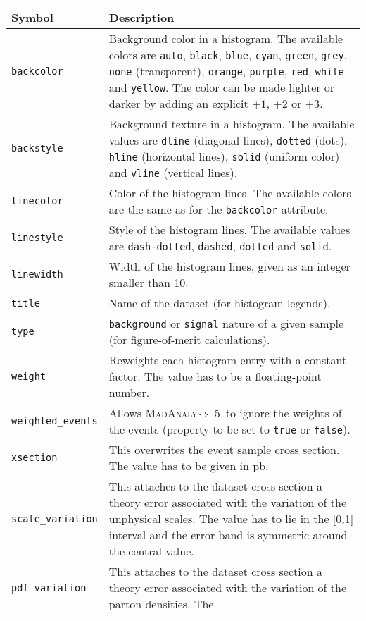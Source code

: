 \documentclass[a4paper]{article}
\newcommand{\MA}{\textsc{MadAnalysis}~5}
\begin{document}
\begin{center}\begin{tabular}{l p{9.1cm}}
\hline
Symbol& Description\\
\hline
\color{ao} \verb?backcolor? & Background color in a histogram. The available colors are
   \verb?auto?, \verb?black?, \verb?blue?, \verb?cyan?, \verb?green?,
   \verb?grey?, \verb?none? (transparent), \verb?orange?, \verb?purple?,
   \verb?red?, \verb?white? and \verb?yellow?. The color can be made lighter or
    darker by adding an explicit $\pm 1$, $\pm 2$ or $\pm 3$.\\
\color{ao} \verb?backstyle? & Background texture in a histogram. The available values are
   \verb?dline? (diagonal-lines), \verb?dotted? (dots), \verb?hline? (horizontal
   lines), \verb?solid? (uniform color) and \verb?vline? (vertical lines).\\
\color{ao} \verb?linecolor? & Color of the histogram lines. The available colors are the
   same as for the \verb?backcolor? attribute.\\
\color{ao} \verb?linestyle? & Style of the histogram lines. The available values are
   \verb?dash-dotted?, \verb?dashed?, \verb?dotted? and \verb?solid?.\\
\color{ao} \verb?linewidth? & Width of the histogram lines, given as an integer smaller
   than 10.\\
\color{ao} \verb?title?     & Name of the dataset (for histogram legends).\\
\color{ao} \verb?type?      & \verb?background? or \verb?signal? nature of a given sample
  (for figure-of-merit calculations).\\
\color{ao} \verb?weight?    & Reweights each histogram entry with a constant factor. The
  value has to be a floating-point number.\\
\color{ao} \verb?weighted_events? & Allows \MA\ to ignore the weights of the events
  (property to be set to \verb?true? or \verb?false?).\\
\color{ao} \verb?xsection?  & This overwrites the event sample cross section. The value has
  to be given in pb.\\
\color{ao} \verb?scale_variation? & This attaches to the dataset cross section
  a theory error associated with the variation of the unphysical scales. The
  value has to lie in the [0,1] interval and the error band is symmetric around
  the central value. \\
\color{ao} \verb?pdf_variation?   &  This attaches to the dataset cross section
  a theory error associated with the variation of the parton densities. The

\end{tabular}
\end{center}
\end{document}
